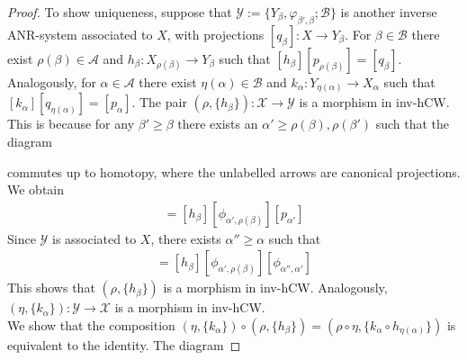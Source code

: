 \documentclass[a4paper,11pt]{article}
\theoremstyle{definition}
\theoremstyle{plain}
\theoremstyle{remark}
\begin{document}
{\begin{proof}
To show uniqueness, suppose that $\mathcal{Y}:=\{Y_{\beta},\varphi_{\beta',\beta};\mathcal{B}\}$ is another inverse ANR-system associated to $X$, with projections $[q_{\beta}]: X\rightarrow Y_{\beta}$. For $\beta\in \mathcal{B}$ there exist $\rho(\beta)\in \mathcal{A}$ and $h_{\beta}: X_{\rho(\beta)}\rightarrow Y_{\beta}$ such that $[h_{\beta}][p_{\rho(\beta)}] = [q_{\beta}]$. Analogously, for $\alpha\in \mathcal{A}$ there exist $\eta(\alpha)\in \mathcal{B}$ and $k_{\alpha}: Y_{\eta(\alpha)}\rightarrow X_{\alpha}$ such that $[k_{\alpha}][q_{\eta(\alpha)}] = [p_{\alpha}]$. The pair $(\rho,\{h_{\beta}\}): \mathcal{X}\rightarrow \mathcal{Y}$ is a morphism in inv-hCW. This is because for any $\beta'\geq \beta$ there exists an $\alpha'\geq \rho(\beta),\rho(\beta')$ such that
the diagram
 \begin{figure}[H]
\center
{}
 \end{figure}
commutes up to homotopy, where the unlabelled arrows are canonical projections. We obtain 
\begin{align*}
[\varphi_{\beta',\beta}][h_{\beta'}][\phi_{\alpha',\rho(\beta')}][p_{\alpha'}]=[h_{\beta}][\phi_{\alpha',\rho(\beta)}][p_{\alpha'}]
\end{align*} Since $\mathcal{Y}$ is associated to $X$, there exists $\alpha''\geq \alpha$ such that 
\begin{align*}
[\varphi_{\beta',\beta}][h_{\beta'}][\phi_{\alpha',\rho(\beta')}][\phi_{\alpha'',\alpha'}]=[h_{\beta}][\phi_{\alpha',\rho(\beta)}][\phi_{\alpha'',\alpha'}]
\end{align*}
This shows that $(\rho,\{h_{\beta}\})$ is a morphism in inv-hCW. Analogously, $(\eta, \{k_{\alpha}\}): \mathcal{Y}\rightarrow \mathcal{X}$ is a morphism in inv-hCW. \\

We show that the composition $(\eta,\{k_{\alpha}\})\circ (\rho,\{h_{\beta}\}) = (\rho\circ\eta, \{k_{\alpha}\circ h_{\eta(\alpha)}\})$ is equivalent to the identity. The diagram 



\end{proof}}
\end{document}
